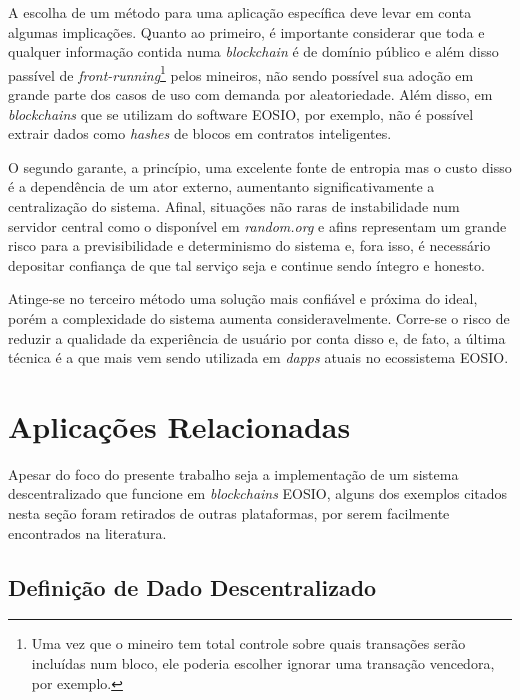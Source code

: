 \documentclass[a4paper,12pt]{monografia}
\theoremstyle{plain}
\theoremstyle{definition}
\theoremstyle{remark}
\begin{document}
A escolha de um m\'{e}todo para uma aplica\c{c}\~{a}o espec\'{i}fica deve levar em conta algumas implica\c{c}\~{o}es.
Quanto ao primeiro, \'{e} importante considerar que toda e qualquer informa\c{c}\~{a}o contida numa \textit{blockchain} \'{e} de dom\'{i}nio p\'{u}blico e al\'{e}m disso pass\'{i}vel de \textit{front-running}\footnote{Uma vez que o mineiro tem total controle sobre quais transa\c{c}\~oes ser\~ao inclu\'idas num bloco, ele poderia escolher ignorar uma transa\c{c}\~ao vencedora, por exemplo.} pelos mineiros, n\~{a}o sendo poss\'{i}vel sua ado\c{c}\~{a}o em grande parte dos casos de uso com demanda por aleatoriedade.
Al\'em disso, em \textit{blockchains} que se utilizam do software EOSIO, por exemplo, n\~ao \'e poss\'ivel extrair dados como \textit{hashes} de blocos em contratos inteligentes.

O segundo garante, a princ\'ipio, uma excelente fonte de entropia mas o custo disso \'{e} a depend\^{e}ncia de um ator externo, aumentanto significativamente a centraliza\c{c}\~{a}o do sistema.
Afinal, situa\c{c}\~{o}es n\~{a}o raras de instabilidade num servidor central como o dispon\'{i}vel em \textit{random.org} e afins representam um grande risco para a previsibilidade e determinismo do sistema e, fora isso, \'{e} necess\'{a}rio depositar confian\c{c}a de que tal servi\c{c}o seja e continue sendo \'{i}ntegro e honesto.

Atinge-se no terceiro m\'etodo uma solu\c{c}\~{a}o mais confi\'{a}vel e pr\'{o}xima do ideal, por\'em a complexidade do sistema aumenta consideravelmente.
Corre-se o risco de reduzir a qualidade da experi\^encia de usu\'ario por conta disso e, de fato, a \'ultima t\'ecnica \'e a que mais vem sendo utilizada em \textit{dapps} atuais no ecossistema EOSIO.

\section{Aplica\c{c}\~{o}es Relacionadas}

Apesar do foco do presente trabalho seja a implementa\c{c}\~{a}o de um sistema descentralizado que funcione em \textit{blockchains} EOSIO, alguns dos exemplos citados nesta se\c{c}\~{a}o foram retirados de outras plataformas, por serem facilmente encontrados na literatura.

\subsection{Defini\c{c}\~ao de Dado Descentralizado}
\end{document}
